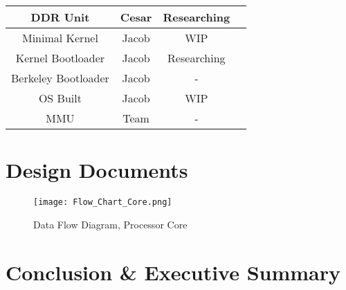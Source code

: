 \documentclass{article}
\begin{document}
\begin{table}[ht]
\begin{tabular}{|c|c|c|c|}
DDR Unit            & Cesar                 & Researching        &                         \\ \hline
Minimal Kernel      & Jacob                 & WIP                &                         \\ \hline
Kernel Bootloader   & Jacob                 & Researching        &                         \\ \hline
Berkeley Bootloader & Jacob                 & -                  &                         \\ \hline
OS Built            & Jacob                 & WIP                &                         \\ \hline
MMU                 & Team                  & -                  &                         \\ \hline
\end{tabular}
\end{table}

\section{Design Documents}
\begin{figure}[ht]
\caption{Data Flow Diagram, Processor Core}
\label{flow}
\centering
\texttt{[image: Flow\_Chart\_Core.png]}
\end{figure}

\section{Conclusion \& Executive Summary}

\printbibliography
\end{document}
